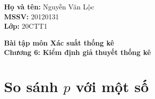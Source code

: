 \documentclass[12pt,a4paper]{article}
\author{Nguyễn Văn Lộc}
\begin{document}
    \fancyhf{}
    \lhead{}
    \chead{}
    \rhead{}
    \cfoot{}
    \rfoot{\thepage}
    \lfoot{}
    \pagestyle{fancy}
    \renewcommand{\headrulewidth}{0pt}
    \renewcommand{\footrulewidth}{0pt}
    \begin{mybox}
    \textbf{Họ và tên:} Nguyễn Văn Lộc\\
    \textbf{MSSV:} 20120131\\
    \textbf{Lớp:} 20CTT1
    \end{mybox}
    \begin{center}
    \fontsize{16}{14}\selectfont
    \textbf{Bài tập môn Xác suất thống kê}\\
    \textbf{Chương 6: Kiểm định giả thuyết thống kê}
    \end{center}
    


\section{So sánh $p$ với một số}




%
%
\end{document}
